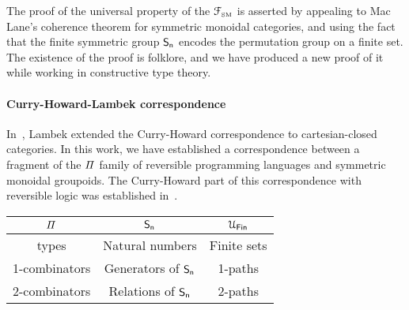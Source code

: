The proof of the universal property of the $\FSM$ is asserted by appealing to Mac Lane's coherence theorem for symmetric
monoidal categories, and using the fact that the finite symmetric group $\Sn$ encodes the permutation group on a finite
set. The existence of the proof is folklore, and we have produced a new proof of it while working in constructive type
theory.

\paragraph{Curry-Howard-Lambek correspondence} In~\citet{curryCurryEssaysCombinatory1980}, Lambek extended the
Curry-Howard correspondence to cartesian-closed categories. In this work, we have established a correspondence between a
fragment of the $\mathit{\Pi}$ family of reversible programming languages and symmetric monoidal groupoids. The Curry-Howard
part of this correspondence with reversible logic was established in~\cite{sparksSuperstructuralReversibleLogic2014}.

\begin{center}
    \begin{tabular}{c c c}
        \hline
        $\mathit{\Pi}$     & $\Sn$               & $\UFin$     \\
        \hline
        types         & Natural numbers     & Finite sets \\
        \hline
        1-combinators & Generators of $\Sn$ & 1-paths     \\
        \hline
        2-combinators & Relations of $\Sn$  & 2-paths     \\
        \hline
    \end{tabular}
\end{center}

